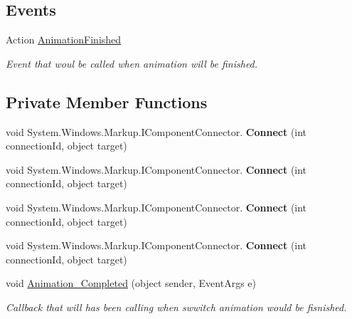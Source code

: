 \subsection*{Events}
\begin{DoxyCompactItemize}
\item 
Action \mbox{\hyperlink{class_wpf_handler_1_1_u_i_1_1_controls_1_1_switch_panel_a1ac8e003ec56876807755b845ad0b205}{Animation\+Finished}}
\begin{DoxyCompactList}\small\item\em Event that woul be called when animation will be finished. \end{DoxyCompactList}\end{DoxyCompactItemize}
\subsection*{Private Member Functions}
\begin{DoxyCompactItemize}
\item 
\mbox{\label{class_wpf_handler_1_1_u_i_1_1_controls_1_1_switch_panel_a17743b6a82dd0acd5d67c97dc38cd156}} 
void System.\+Windows.\+Markup.\+I\+Component\+Connector. {\bfseries Connect} (int connection\+Id, object target)
\item 
\mbox{\label{class_wpf_handler_1_1_u_i_1_1_controls_1_1_switch_panel_a17743b6a82dd0acd5d67c97dc38cd156}} 
void System.\+Windows.\+Markup.\+I\+Component\+Connector. {\bfseries Connect} (int connection\+Id, object target)
\item 
\mbox{\label{class_wpf_handler_1_1_u_i_1_1_controls_1_1_switch_panel_a17743b6a82dd0acd5d67c97dc38cd156}} 
void System.\+Windows.\+Markup.\+I\+Component\+Connector. {\bfseries Connect} (int connection\+Id, object target)
\item 
\mbox{\label{class_wpf_handler_1_1_u_i_1_1_controls_1_1_switch_panel_a17743b6a82dd0acd5d67c97dc38cd156}} 
void System.\+Windows.\+Markup.\+I\+Component\+Connector. {\bfseries Connect} (int connection\+Id, object target)
\item 
void \mbox{\hyperlink{class_wpf_handler_1_1_u_i_1_1_controls_1_1_switch_panel_aee8ae4fc196bb52df9784f6c0b71a172}{Animation\+\_\+\+Completed}} (object sender, Event\+Args e)
\begin{DoxyCompactList}\small\item\em Callback that will has been calling when swwitch animation would be fisnished. \end{DoxyCompactList}\end{DoxyCompactItemize}
